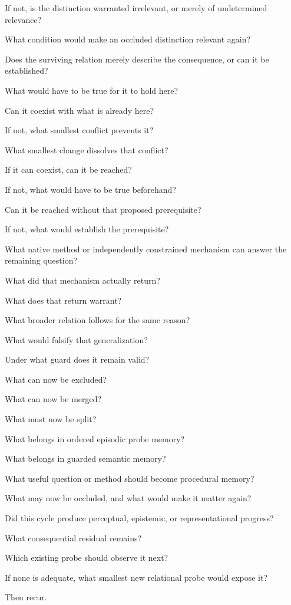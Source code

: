 \documentclass[
]{article}
\begin{document}
If not, is the distinction warranted irrelevant, or merely of undetermined
relevance?

What condition would make an occluded distinction relevant again?

Does the surviving relation merely describe the consequence, or can it be
established?

What would have to be true for it to hold here?

Can it coexist with what is already here?

If not, what smallest conflict prevents it?

What smallest change dissolves that conflict?

If it can coexist, can it be reached?

If not, what would have to be true beforehand?

Can it be reached without that proposed prerequisite?

If not, what would establish the prerequisite?

What native method or independently constrained mechanism can answer the
remaining question?

What did that mechanism actually return?

What does that return warrant?

What broader relation follows for the same reason?

What would falsify that generalization?

Under what guard does it remain valid?

What can now be excluded?

What can now be merged?

What must now be split?

What belongs in ordered episodic probe memory?

What belongs in guarded semantic memory?

What useful question or method should become procedural memory?

What may now be occluded, and what would make it matter again?

Did this cycle produce perceptual, epistemic, or representational progress?

What consequential residual remains?

Which existing probe should observe it next?

If none is adequate, what smallest new relational probe would expose it?

Then recur.
\end{document}
